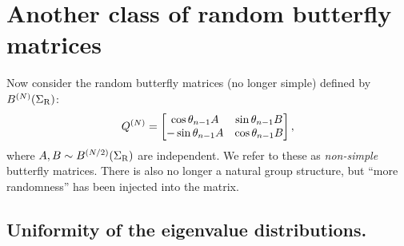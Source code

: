 \documentclass{amsart}
\theoremstyle{definition}
\theoremstyle{remark}
\numberwithin{equation}{section}
\DeclareMathOperator{\D}{d}
\DeclareMathOperator{\E}{e}
\DeclareMathOperator{\tr}{tr}
\begin{document}


\section{Another class of random butterfly matrices}\label{s:general}

Now consider the random butterfly matrices (no longer simple) defined by $B^{(N)}(\Sigma_{\mathrm{R}})$:
\begin{align}\label{e:rbf}
Q^{(N)} = \begin{bmatrix} \cos \theta_{n-1} A & \sin \theta_{n-1} B \\
-\sin \theta_{n-1} A & \cos \theta_{n-1} B \end{bmatrix},
\end{align}
where $A,B \sim B ^{(N/2)}(\Sigma_{\mathrm{R}})$ are independent.  We refer to these as \emph{non-simple} butterfly matrices.  There is also no longer a natural group structure, but ``more randomness'' has been injected into the matrix.

\subsection{Uniformity of the eigenvalue distributions.}
\end{document}
